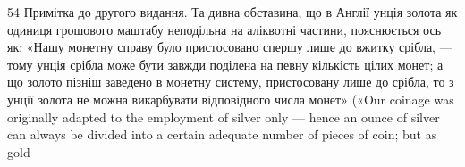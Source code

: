 54 Примітка до другого видання. Та дивна обставина, що в Англії унція золота як одиниця грошового
маштабу неподільна на аліквотні частини, пояснюється ось як: «Нашу монетну справу було пристосовано
спершу лише до вжитку срібла, — тому унція срібла може бути завжди поділена на певну кількість цілих
монет; а що золото пізніш заведено в монетну систему, пристосовану лише до срібла, то з унції золота
не можна
викарбувати відповідного числа монет» («Our coinage was originally adapted to the employment of
silver only — hence an ounce of silver can always be divided into a certain adequate number of
pieces of coin; but as gold
